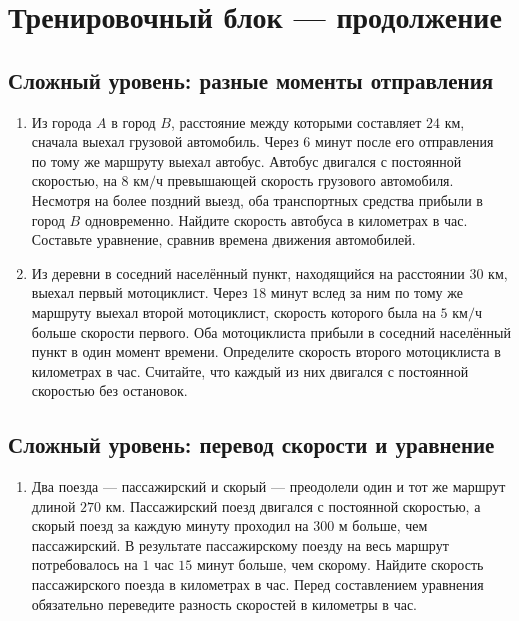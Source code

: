 \documentclass[a4paper,12pt]{article}
\newcommand{\topic}[1]{\section*{\color{darkaccent}#1}}
\newcommand{\subtopic}[1]{\subsection*{\color{accent}#1}}
\newcommand{\kmh}{\text{ км/ч}}
\newcommand{\kms}{\text{ км}}
\newcommand{\met}{\text{ м}}
\begin{document}
\clearpage
\topic{Тренировочный блок --- продолжение}
\subtopic{Сложный уровень: разные моменты отправления}
\begin{enumerate}[label=\textbf{\arabic*.},start=8,wide=0pt]
\item Из города $A$ в город $B$, расстояние между которыми составляет $24\kms$, сначала выехал грузовой автомобиль. Через $6$ минут после его отправления по тому же маршруту выехал автобус. Автобус двигался с постоянной скоростью, на $8\kmh$ превышающей скорость грузового автомобиля. Несмотря на более поздний выезд, оба транспортных средства прибыли в город $B$ одновременно. Найдите скорость автобуса в километрах в час. Составьте уравнение, сравнив времена движения автомобилей.

\item Из деревни в соседний населённый пункт, находящийся на расстоянии $30\kms$, выехал первый мотоциклист. Через $18$ минут вслед за ним по тому же маршруту выехал второй мотоциклист, скорость которого была на $5\kmh$ больше скорости первого. Оба мотоциклиста прибыли в соседний населённый пункт в один момент времени. Определите скорость второго мотоциклиста в километрах в час. Считайте, что каждый из них двигался с постоянной скоростью без остановок.
\end{enumerate}

\subtopic{Сложный уровень: перевод скорости и уравнение}
\begin{enumerate}[label=\textbf{\arabic*.},start=10,wide=0pt]
\item Два поезда --- пассажирский и скорый --- преодолели один и тот же маршрут длиной $270\kms$. Пассажирский поезд двигался с постоянной скоростью, а скорый поезд за каждую минуту проходил на $300\met$ больше, чем пассажирский. В результате пассажирскому поезду на весь маршрут потребовалось на $1$ час $15$ минут больше, чем скорому. Найдите скорость пассажирского поезда в километрах в час. Перед составлением уравнения обязательно переведите разность скоростей в километры в час.
\end{enumerate}
\end{document}
